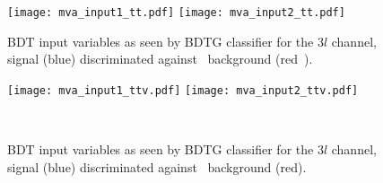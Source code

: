 \begin{figure} [!h]
  \centering
  \texttt{[image: mva\_input1\_tt.pdf]}
  \texttt{[image: mva\_input2\_tt.pdf]}
  \caption[BDT input variables. Discrimination against \ttbar in $3l$ channel.]{BDT input variables as seen by BDTG classifier for the $3l$ channel, \tHq signal (blue) discriminated against \ttbar\ background (red\
    ).}
  \label{mva_input_tt}
\end{figure}

\begin{figure} [!h]
  \centering
  \texttt{[image: mva\_input1\_ttv.pdf]}
  \texttt{[image: mva\_input2\_ttv.pdf]}
  \caption[BDT input variables. Discrimination against \ttV\ in $3l$ channel.]{BDT input variables as seen by BDTG classifier for the $3l$ channel, \tHq signal (blue) discriminated against \ttV\ background (red).}\

  \label{mva_input_ttv}
\end{figure}
